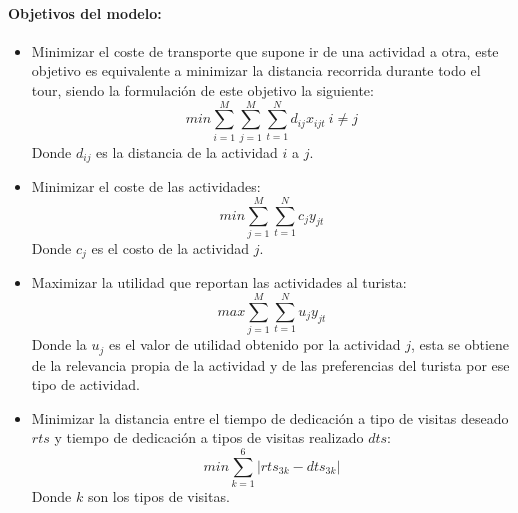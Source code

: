 \paragraph{Objetivos del modelo:}
\begin{itemize}
    \item Minimizar el coste de transporte que supone ir de una actividad a otra, este objetivo es equivalente a minimizar la distancia recorrida durante todo el tour, siendo la formulación de este objetivo la siguiente:
    \begin{equation}
        min \sum_{i=1}^{M}\sum_{j=1}^{M}\sum_{t=1}^{N}d_{ij}x_{ijt} \: i\neq j
    \end{equation}
    Donde $d_{ij}$ es la distancia de la actividad $i$ a $j$.
    
    \item Minimizar el coste de las actividades:
    \begin{equation}
        min \sum_{j=1}^{M}\sum_{t=1}^{N} c_{j}y_{jt}
    \end{equation}
    Donde $c_{j}$ es el costo de la actividad $j$. 
    
    \item Maximizar la utilidad que reportan las actividades al turista:
    \begin{equation}
        max\sum_{j=1}^{M}\sum_{t=1}^{N}u_{j}y_{jt}
    \end{equation}
    Donde la $u_{j}$ es el valor de utilidad obtenido por la actividad $j$, esta se obtiene de la relevancia propia de la actividad y de las preferencias del turista por ese tipo de actividad.
    
    \item Minimizar la distancia entre el tiempo de dedicación a tipo de visitas deseado $rts$ y tiempo de dedicación a tipos de visitas realizado $dts$:
    \begin{equation}
        min\sum_{k=1}^{6}|rts_{3k}-dts_{3k}|
    \end{equation}
    Donde $k$ son los tipos de visitas.
\end{itemize}
